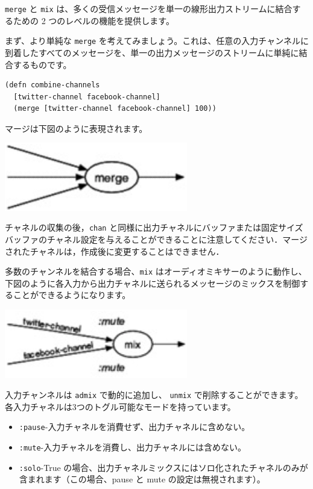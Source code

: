 \texttt{merge} と \texttt{mix} は、多くの受信メッセージを単一の線形出力ストリームに結合するための 2 つのレベルの機能を提供します。

まず、より単純な \texttt{merge} を考えてみましょう。これは、任意の入力チャンネルに到着したすべてのメッセージを、単一の出力メッセージのストリームに単純に結合するものです。

\begin{lstlisting}[numbers=none]
(defn combine-channels
  [twitter-channel facebook-channel]
  (merge [twitter-channel facebook-channel] 100))
\end{lstlisting}

マージは下図のように表現されます。

\includegraphics[width=8cm]{fig_06_006.eps}

チャネルの収集の後，\texttt{chan} と同様に出力チャネルにバッファまたは固定サイズバッファのチャネル設定を与えることができることに注意してください．マージされたチャネルは，作成後に変更することはできません．

多数のチャンネルを結合する場合、\texttt{mix} はオーディオミキサーのように動作し、下図のように各入力から出力チャネルに送られるメッセージのミックスを制御することができるようになります。

\includegraphics[width=8cm]{fig_06_007.eps}

入力チャンネルは \texttt{admix} で動的に追加し、 \texttt{unmix} で削除することができます。各入力チャネルは3つのトグル可能なモードを持っています。
\begin{itemize}
\item \texttt{:pause}-入力チャネルを消費せず、出力チャネルに含めない。

\item \texttt{:mute}-入力チャネルを消費し、出力チャネルには含めない。

\item \texttt{:solo}-True の場合、出力チャネルミックスにはソロ化されたチャネルのみが含まれます（この場合、pause と mute の設定は無視されます）。
\end{itemize}

